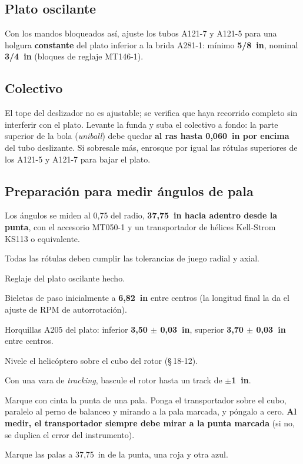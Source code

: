 \subsection{Plato oscilante}

Con los mandos bloqueados así, ajuste los tubos A121-7 y A121-5 para una holgura \textbf{constante} del plato inferior a la brida A281-1: mínimo \textbf{5/8~in}, nominal \textbf{3/4~in} (bloques de reglaje MT146-1).

\subsection{Colectivo}

El tope del deslizador no es ajustable; se verifica que haya recorrido completo sin interferir con el plato. Levante la funda y suba el colectivo a fondo: la parte superior de la bola (\emph{uniball}) debe quedar \textbf{al ras hasta 0,060~in por encima} del tubo deslizante. Si sobresale más, enrosque por igual las rótulas superiores de los A121-5 y A121-7 para bajar el plato.

\subsection{Preparación para medir ángulos de pala}

Los ángulos se miden al 0,75 del radio, \textbf{37,75~in hacia adentro desde la punta}, con el accesorio MT050-1 y un transportador de hélices Kell-Strom KS113 o equivalente.

\begin{pasos}
\item Todas las rótulas deben cumplir las tolerancias de juego radial y axial.
\item Reglaje del plato oscilante hecho.
\item Bieletas de paso inicialmente a \textbf{6,82~in} entre centros (la longitud final la da el ajuste de RPM de autorrotación).
\item Horquillas A205 del plato: inferior \textbf{3,50 $\pm$ 0,03~in}, superior \textbf{3,70 $\pm$ 0,03~in} entre centros.
\item Nivele el helicóptero sobre el cubo del rotor (\S\,18-12).
\item Con una vara de \emph{tracking}, bascule el rotor hasta un track de \textbf{$\pm$1~in}.
\item Marque con cinta la punta de una pala. Ponga el transportador sobre el cubo, paralelo al perno de balanceo y mirando a la pala marcada, y póngalo a cero. \textbf{Al medir, el transportador siempre debe mirar a la punta marcada} (si no, se duplica el error del instrumento).
\item Marque las palas a 37,75~in de la punta, una roja y otra azul.
\end{pasos}


